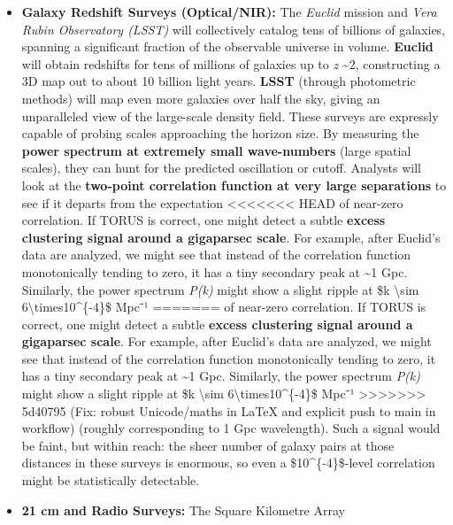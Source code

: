 \documentclass[]{article}
\begin{document}
\begin{itemize}
\item
  \textbf{Galaxy Redshift Surveys (Optical/NIR):} The \emph{Euclid}
  mission and \emph{Vera Rubin Observatory (LSST)} will collectively
  catalog tens of billions of galaxies, spanning a significant fraction
  of the observable universe in volume. \textbf{Euclid} will obtain
  redshifts for tens of millions of galaxies up to \emph{z}
  \textasciitilde{}2, constructing a 3D map out to about 10 billion
  light years. \textbf{LSST} (through photometric methods) will map even
  more galaxies over half the sky, giving an unparalleled view of the
  large-scale density field. These surveys are expressly capable of
  probing scales approaching the horizon size. By measuring the
  \textbf{power spectrum at extremely small wave-numbers} (large spatial
  scales), they can hunt for the predicted oscillation or cutoff.
  Analysts will look at the \textbf{two-point correlation function at
  very large separations} to see if it departs from the \LambdaCDM expectation
<<<<<<< HEAD
  of near-zero correlation\hspace{0pt}. If TORUS is correct, one might
  detect a subtle \textbf{excess clustering signal around a gigaparsec
  scale}\hspace{0pt}. For example, after Euclid's data are analyzed, we
  might see that instead of the correlation function monotonically
  tending to zero, it has a tiny secondary peak at \textasciitilde1 Gpc.
  Similarly, the power spectrum \emph{P(k)} might show a slight ripple
  at \$k \textbackslash sim 6\textbackslash times10\^{}\{-4\}\$ Mpc⁻¹
=======
  of near-zero correlation​. If TORUS is correct, one might detect a
  subtle \textbf{excess clustering signal around a gigaparsec scale}​.
  For example, after Euclid's data are analyzed, we might see that
  instead of the correlation function monotonically tending to zero, it
  has a tiny secondary peak at \textasciitilde{}1 Gpc. Similarly, the
  power spectrum \emph{P(k)} might show a slight ripple at \$k
  \textbackslash{}sim 6\textbackslash{}times10\^{}\{-4\}\$ Mpc⁻¹
>>>>>>> 5d40795 (Fix: robust Unicode/maths in LaTeX and explicit push to main in workflow)
  (roughly corresponding to 1 Gpc wavelength). Such a signal would be
  faint, but within reach: the sheer number of galaxy pairs at those
  distances in these surveys is enormous, so even a
  \$10\^{}\{-4\}\$-level correlation might be statistically detectable​.
\item
  \textbf{21 cm and Radio Surveys:} The Square Kilometre Array

\end{itemize}
\end{document}
